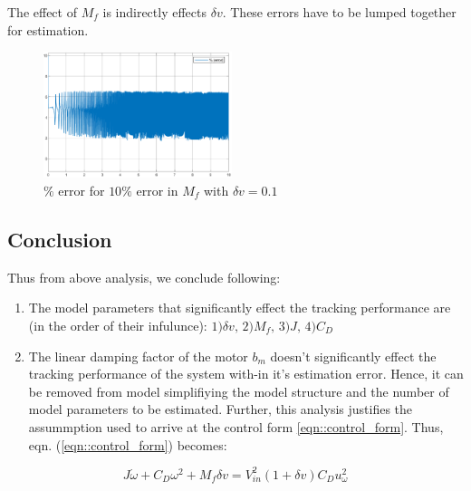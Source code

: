 The effect of $M_f$ is indirectly effects $\delta v$. These errors have to be
lumped together for estimation.
    \begin{figure}[H]
        \includegraphics[width = 0.49\textwidth]{figs/par_var/m_f.eps}
        \caption{$\%$ error for $10\%$ error in $M_f$ with $\delta v=0.1$}
    \end{figure}


\subsection{Conclusion}
Thus from above analysis, we conclude following:

\begin{enumerate}
\item The model parameters that significantly effect the tracking performance
are (in the order of their infulunce): $1) \delta v, \, 2) M_f, \, 3)J, \, 4) C_D$
\item The linear damping factor of the motor $b_m$ doesn't significantly effect
the tracking performance of the system with-in it's estimation error. Hence, it can be removed from model simplifiying the model structure and the number of
model parameters to be estimated. Further, this analysis justifies the
assummption used to arrive at the control form \ref{eqn::control_form}. Thus, eqn. (\ref{eqn::control_form}) becomes:
\end{enumerate}

\begin{equation}\label{eqn::no_bm_ctrl_form}
    J \dot \omega + C_D \omega^2 + M_f \delta v = V_{in}^2 (1 + \delta v) C_D u_\omega^2
\end{equation}

